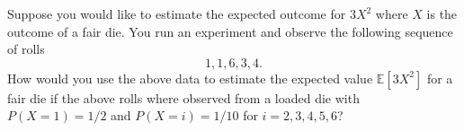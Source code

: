 Suppose you would like to estimate the expected outcome for 
$3X^2$ where $X$ is the outcome of a fair die. 
You run an experiment and observe the following sequence of rolls
\[
	1,1,6,3,4.
\]
How would you use the above data to estimate the expected value 
$\mathbb{E}[3X^2]$ for a fair die if the above rolls where observed 
from a loaded die with $P(X=1) = 1/2$ and $P(X=i)=1/10$ for $i=2,3,4,5,6$?



